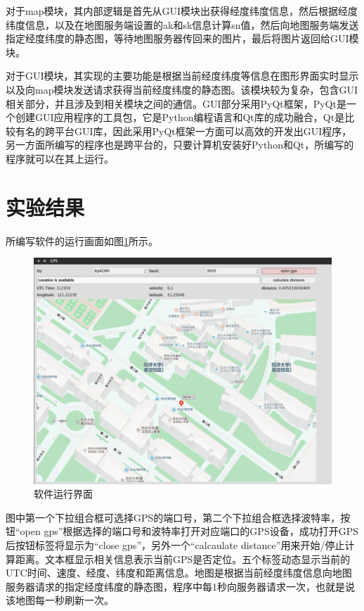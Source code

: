 \documentclass[a4paper, 12pt]{article}
\begin{document}
对于map模块，其内部逻辑是首先从GUI模块出获得经度纬度信息，然后根据经度纬度信息，以及在地图服务端设置的ak和sk信息计算sn值，然后向地图服务端发送指定经度纬度的静态图，等待地图服务器传回来的图片，最后将图片返回给GUI模块。

对于GUI模块，其实现的主要功能是根据当前经度纬度等信息在图形界面实时显示以及向map模块发送请求获得当前经度纬度的静态图。该模块较为复杂，包含GUI相关部分，并且涉及到相关模块之间的通信。GUI部分采用PyQt框架，PyQt是一个创建GUI应用程序的工具包，它是Python编程语言和Qt库的成功融合，Qt是比较有名的跨平台GUI库，因此采用PyQt框架一方面可以高效的开发出GUI程序，另一方面所编写的程序也是跨平台的，只要计算机安装好Python和Qt，所编写的程序就可以在其上运行。

\section{实验结果}
所编写软件的运行画面如图\ref{fig:soft}所示。
\begin{figure}[ht]
  \centering
  \includegraphics[width=15cm]{soft.png}
  \caption{软件运行界面}
  \label{fig:soft}
\end{figure}
图中第一个下拉组合框可选择GPS的端口号，第二个下拉组合框选择波特率，按钮“open gps”根据选择的端口号和波特率打开对应端口的GPS设备，成功打开GPS后按钮标签将显示为“close gps”，另外一个“calcaulate distance”用来开始/停止计算距离。文本框显示相关信息表示当前GPS是否定位。五个标签动态显示当前的UTC时间、速度、经度、纬度和距离信息。地图是根据当前经度纬度信息向地图服务器请求的指定经度纬度的静态图，程序中每1秒向服务器请求一次，也就是说该地图每一秒刷新一次。
\end{document}
